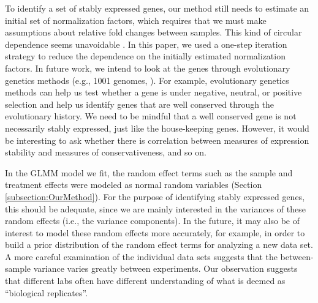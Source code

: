 \documentclass[letterpaper,12pt]{article}
\begin{document}

To identify a set of stably expressed genes, our method still needs to estimate
an initial set of normalization factors, which requires that we must make assumptions 
about relative fold changes between samples. This kind of circular dependence
seems unavoidable \citep{vandesompele2002accurate}. In this paper, we used a
one-step iteration strategy to reduce the dependence on the initially
estimated normalization factors.  
In future work, we intend to look at the genes through evolutionary genetics
methods (e.g., 1001 genomes, \cite{weigel20091001}).  For example, evolutionary genetics methods can
help us test whether a gene is under negative, neutral, or positive selection
and help us identify genes that are well conserved through the evolutionary
history. We need to be mindful that a well conserved gene is not necessarily
stably expressed, just like the house-keeping genes. However, it would be
interesting to ask whether there is correlation between measures of expression
stability and measures of conservativeness, and so on.


In the GLMM model we fit, the random effect terms such as the sample and treatment
effects were modeled as normal random variables (Section
\ref{subsection:OurMethod}). For the purpose of identifying stably
expressed genes, this should be adequate, since we are mainly interested in
the variances of these random effects (i.e., the variance components). In the
future, it may also be of interest to model these random effects more
accurately, for example, in order to build a prior distribution of the random
effect terms for analyzing a new data set. A more careful examination of the
individual data sets suggests that the between-sample variance varies greatly
between experiments. Our observation suggests that different labs often have
different understanding of what is deemed as ``biological replicates''.
\end{document}
